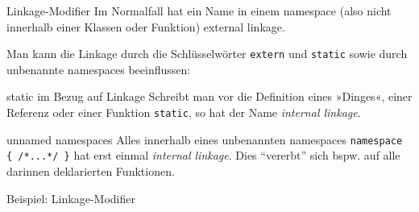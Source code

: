 \begin{frame}[fragile]{Linkage-Modifier}
	Im Normalfall hat ein Name in einem namespace (also nicht innerhalb einer Klassen oder Funktion) external linkage.
	
	\vspace{1em}
	
	Man kann die Linkage durch die Schlüsselwörter \verb|extern| und \verb|static| sowie durch unbenannte namespaces beeinflussen:
	
	\pause
	
	\begin{block}{static im Bezug auf Linkage}
		Schreibt man vor die Definition eines »Dinges«, einer Referenz oder einer Funktion \verb|static|, so hat der Name \emph{internal linkage}.
	\end{block}
	
	\pause
	
	\begin{block}{unnamed namespaces}
		Alles innerhalb eines unbenannten namespaces \verb|namespace { /*...*/ }| hat erst einmal \emph{internal linkage}. Dies \enquote{vererbt} sich bspw. auf alle darinnen deklarierten Funktionen.
	\end{block}
\end{frame}

\begin{frame}{Beispiel: Linkage-Modifier}
	\footnotesize
	\alt<2>
	{%
		
	}{%
		
	}
\end{frame}
